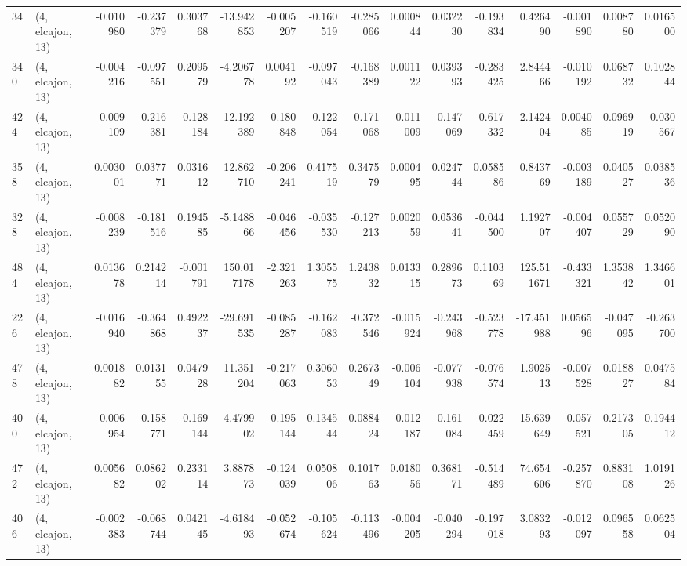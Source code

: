 \begin{tabular}{llrrrrrrrrrrrrrr}
34  &  (4, elcajon, 13) &  -0.010980 & -0.237379 &  0.303768 &   -13.942853 &  -0.005207 &  -0.160519 &  -0.285066 &  0.000844 &  0.032230 & -0.193834 &    0.426490 & -0.001890 &  0.008780 &  0.016500 \\
340 &  (4, elcajon, 13) &  -0.004216 & -0.097551 &  0.209579 &    -4.206778 &   0.004192 &  -0.097043 &  -0.168389 &  0.001122 &  0.039393 & -0.283425 &    2.844466 & -0.010192 &  0.068732 &  0.102844 \\
424 &  (4, elcajon, 13) &  -0.009109 & -0.216381 & -0.128184 &   -12.192389 &  -0.180848 &  -0.122054 &  -0.171068 & -0.011009 & -0.147069 & -0.617332 &   -2.142404 &  0.004085 &  0.096919 & -0.030567 \\
358 &  (4, elcajon, 13) &   0.003001 &  0.037771 &  0.031612 &    12.862710 &  -0.206241 &   0.417519 &   0.347579 &  0.000495 &  0.024744 &  0.058586 &    0.843769 & -0.003189 &  0.040527 &  0.038536 \\
328 &  (4, elcajon, 13) &  -0.008239 & -0.181516 &  0.194585 &    -5.148866 &  -0.046456 &  -0.035530 &  -0.127213 &  0.002059 &  0.053641 & -0.044500 &    1.192707 & -0.004407 &  0.055729 &  0.052090 \\
484 &  (4, elcajon, 13) &   0.013678 &  0.214214 & -0.001791 &   150.017178 &  -2.321263 &   1.305575 &   1.243832 &  0.013315 &  0.289673 &  0.110369 &  125.511671 & -0.433321 &  1.353842 &  1.346601 \\
226 &  (4, elcajon, 13) &  -0.016940 & -0.364868 &  0.492237 &   -29.691535 &  -0.085287 &  -0.162083 &  -0.372546 & -0.015924 & -0.243968 & -0.523778 &  -17.451988 &  0.056596 & -0.047095 & -0.263700 \\
478 &  (4, elcajon, 13) &   0.001882 &  0.013155 &  0.047928 &    11.351204 &  -0.217063 &   0.306053 &   0.267349 & -0.006104 & -0.077938 & -0.076574 &    1.902513 & -0.007528 &  0.018827 &  0.047584 \\
400 &  (4, elcajon, 13) &  -0.006954 & -0.158771 & -0.169144 &     4.479902 &  -0.195144 &   0.134544 &   0.088424 & -0.012187 & -0.161084 & -0.022459 &   15.639649 & -0.057521 &  0.217305 &  0.194412 \\
472 &  (4, elcajon, 13) &   0.005682 &  0.086202 &  0.233114 &     3.887873 &  -0.124039 &   0.050806 &   0.101763 &  0.018056 &  0.368171 & -0.514489 &   74.654606 & -0.257870 &  0.883108 &  1.019126 \\
406 &  (4, elcajon, 13) &  -0.002383 & -0.068744 &  0.042145 &    -4.618493 &  -0.052674 &  -0.105624 &  -0.113496 & -0.004205 & -0.040294 & -0.197018 &    3.083293 & -0.012097 &  0.096558 &  0.062504 \\

\end{tabular}
